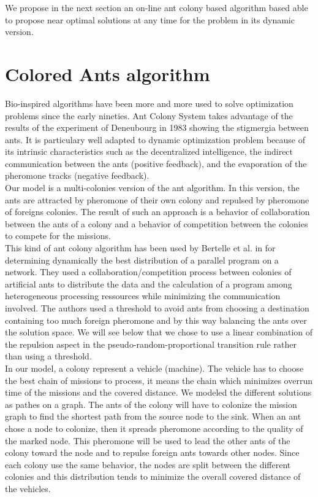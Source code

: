 \documentclass[a4paper,10pt]{article}
\begin{document}
We propose in the next section an on-line ant colony based algorithm based able to propose near optimal solutions at any time for the problem in its dynamic version.

\section{Colored Ants algorithm}
Bio-inspired algorithms have been more and more used to solve optimization problems since the early nineties\cite{Dorigo2006}. Ant Colony System takes advantage of the results of the experiment of Deneubourg in 1983 \cite{Deneubourg1983} showing the stigmergia between ants. It is particulary well adapted to dynamic optimization problem because of its intrinsic characteristics such as the decentralized intelligence, the indirect communication between the ants (positive feedback), and the evaporation of the pheromone tracks (negative feedback).\\

Our model is a multi-colonies version of the ant algorithm. In this version, the ants are attracted by pheromone of their own colony and repulsed by pheromone of foreigns colonies. The result of such an approach is a behavior of collaboration between the ants of a colony and a behavior of competition between the colonies to compete for the missions.\\

This kind of ant colony algorithm has been used by Bertelle et al. in \cite{Bertelle2006,Bertelle2007} for determining dynamically the best distribution of a parallel program on a network. They used a collaboration/competition process between colonies of artificial ants to distribute the data and the calculation of a program among heterogeneous processing ressources while minimizing the communication involved. The authors used a threshold to avoid ants from choosing a destination containing too much foreign pheromone and by this way balancing the ants over the solution space. We will see below that we chose to use a linear combination of the repulsion aspect in the pseudo-random-proportional transition rule rather than using a threshold.\\

In our model, a colony represent a vehicle (machine). The vehicle has to choose the best chain of missions to process, it means the chain which minimizes overrun time of the missions and the covered distance. We modeled the different solutions as pathes on a graph. The ants of the colony will have to colonize the mission graph to find the shortest path from the source node to the sink. When an ant chose a node to colonize, then it spreads pheromone according to the quality of the marked node. This pheromone will be used to lead the other ants of the colony toward the node and to repulse foreign ants towards other nodes.
Since each colony use the same behavior, the nodes are split between the different colonies and this distribution tends to minimize the overall covered distance of the vehicles.\\
\end{document}
